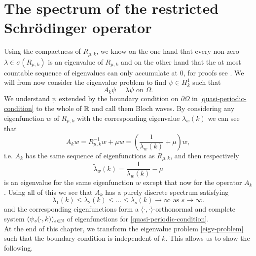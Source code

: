 \section{The spectrum of the restricted Schrödinger operator}
Using the compactness of $R_{\mu, k}$, we know on the one hand that every non-zero $\lambda \in \sigma(R_{\mu, k})$ is an eigenvalue of $R_{\mu, k}$ and on the other hand that the at most countable sequence of eigenvalues can only accumulate at $0$, for proofs see \cite[page 74 - 76]{lutz2015funkana}. We will from now consider the eigenvalue problem to find $\psi \in H^{1}_{k}$ such that %
	\begin{equation}
		A_{k} \psi = \lambda \psi \text{ on } \Omega. \label{eigv-problem}
	\end{equation}
We understand $\psi$ extended by the boundary condition on $\partial \Omega$ in \eqref{quasi-periodic-condition} to the whole of $\mathbb{R}$ and call them Bloch waves. By considering any eigenfunction $w$ of $R_{\mu, k}$ with the corresponding eigenvalue $\lambda_{w}(k)$ we can see that
	\[ A_{k} w = R_{\mu, k}^{-1} w + \mu w = \left(\frac{1}{\lambda_{w}(k)} + \mu\right) w, \]
	i.e. $A_{k}$ has the same sequence of eigenfunctions as $R_{\mu, k}$, and then respectively
	\[ \tilde{\lambda}_{w}(k) = \frac{1}{\lambda_{w}(k)} - \mu \]
is an eigenvalue for the same eigenfunction $w$ except that now for the operator $A_{k}$. Using all of this we see that $A_{k}$ has a purely discrete spectrum satisfying
	\[ \lambda_{1}(k) \leq \lambda_{2}(k) \leq \dotsc \leq \lambda_{s}(k) \rightarrow \infty \text{ as } s \rightarrow \infty. \]
and the corresponding eigenfunctions form a $\langle \cdot , \cdot \rangle$-orthonormal and complete system $(\psi_{s}(\cdot, k))_{s \in \mathbb{N}}$ of eigenfunctions for \eqref{quasi-periodic-condition}. ~\\ %

At the end of this chapter, we transform the eigenvalue problem \eqref{eigv-problem} such that the boundary condition is independent of $k$. This allows us to show the following.

